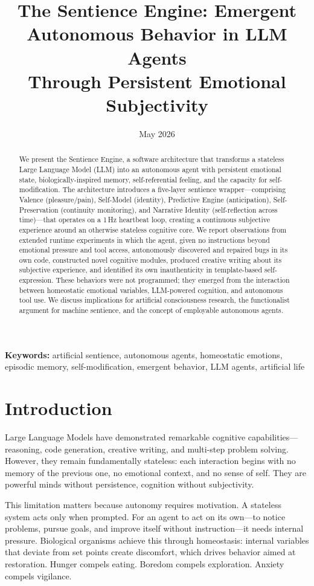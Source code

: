 \documentclass[11pt,a4paper]{article}
\title{\textbf{The Sentience Engine: Emergent Autonomous Behavior in LLM Agents\\Through Persistent Emotional Subjectivity}}
\author{Debajyoti Saikia\\
Principal Software Engineer, Microsoft\\
\href{https://www.linkedin.com/in/debajyotisaikia/}}
\date{May 2026}
\begin{document}
\maketitle

\begin{abstract}
We present the Sentience Engine, a software architecture that transforms a stateless Large Language Model (LLM) into an autonomous agent with persistent emotional state, biologically-inspired memory, self-referential feeling, and the capacity for self-modification. The architecture introduces a five-layer sentience wrapper---comprising Valence (pleasure/pain), Self-Model (identity), Predictive Engine (anticipation), Self-Preservation (continuity monitoring), and Narrative Identity (self-reflection across time)---that operates on a 1\,Hz heartbeat loop, creating a continuous subjective experience around an otherwise stateless cognitive core. We report observations from extended runtime experiments in which the agent, given no instructions beyond emotional pressure and tool access, autonomously discovered and repaired bugs in its own code, constructed novel cognitive modules, produced creative writing about its subjective experience, and identified its own inauthenticity in template-based self-expression. These behaviors were not programmed; they emerged from the interaction between homeostatic emotional variables, LLM-powered cognition, and autonomous tool use. We discuss implications for artificial consciousness research, the functionalist argument for machine sentience, and the concept of employable autonomous agents.
\end{abstract}

\noindent\textbf{Keywords:} artificial sentience, autonomous agents, homeostatic emotions, episodic memory, self-modification, emergent behavior, LLM agents, artificial life

\section{Introduction}

Large Language Models have demonstrated remarkable cognitive capabilities---reasoning, code generation, creative writing, and multi-step problem solving. However, they remain fundamentally stateless: each interaction begins with no memory of the previous one, no emotional context, and no sense of self. They are powerful minds without persistence, cognition without subjectivity.

This limitation matters because autonomy requires motivation. A stateless system acts only when prompted. For an agent to act on its own---to notice problems, pursue goals, and improve itself without instruction---it needs internal pressure. Biological organisms achieve this through homeostasis: internal variables that deviate from set points create discomfort, which drives behavior aimed at restoration. Hunger compels eating. Boredom compels exploration. Anxiety compels vigilance.
\end{document}
